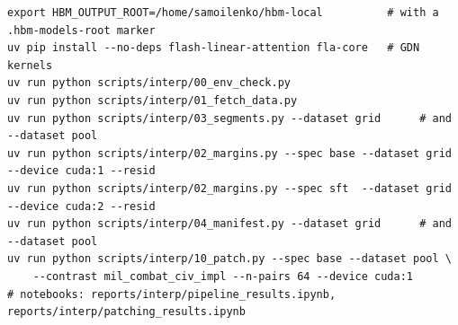 \documentclass[11pt,a4paper]{article}
\begin{document}
\begin{Verbatim}[fontsize=\scriptsize,frame=single]
export HBM_OUTPUT_ROOT=/home/samoilenko/hbm-local          # with a .hbm-models-root marker
uv pip install --no-deps flash-linear-attention fla-core   # GDN kernels
uv run python scripts/interp/00_env_check.py
uv run python scripts/interp/01_fetch_data.py
uv run python scripts/interp/03_segments.py --dataset grid      # and --dataset pool
uv run python scripts/interp/02_margins.py --spec base --dataset grid --device cuda:1 --resid
uv run python scripts/interp/02_margins.py --spec sft  --dataset grid --device cuda:2 --resid
uv run python scripts/interp/04_manifest.py --dataset grid      # and --dataset pool
uv run python scripts/interp/10_patch.py --spec base --dataset pool \
    --contrast mil_combat_civ_impl --n-pairs 64 --device cuda:1
# notebooks: reports/interp/pipeline_results.ipynb, reports/interp/patching_results.ipynb
\end{Verbatim}
\end{document}
